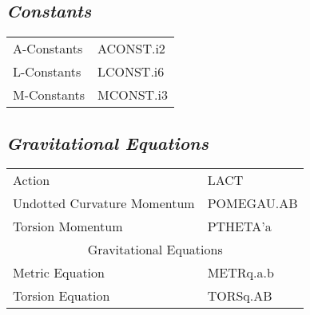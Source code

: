 \documentclass[twocolumn]{article}
\newcommand{\grgtt}{\ttfamily}
\renewcommand{\tt}{\grgtt}
\begin{document}
\subsection{\sf\slshape Constants}
\begin{tabular}{|l|l|}\hline
\tt    A-Constants &\tt   ACONST.i2\\
\tt    L-Constants &\tt   LCONST.i6\\
\tt    M-Constants &\tt   MCONST.i3\\
\hline\end{tabular}

\subsection{\sf\slshape  Gravitational Equations}
\begin{tabular}{|l|l|}\hline
\tt    Action                      &\tt  LACT\\
\tt    Undotted Curvature Momentum &\tt  POMEGAU.AB\\
\tt    Torsion Momentum            &\tt  PTHETA'a\\
\hline
\multicolumn{2}{|c|}{\tt    Gravitational Equations}\\
\tt    Metric Equation             &\tt  METRq.a.b\\
\tt    Torsion Equation            &\tt  TORSq.AB\\
\hline\end{tabular}
\end{document}
